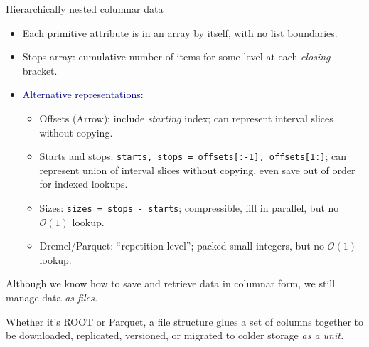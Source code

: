\documentclass[aspectratio=169]{beamer}
\begin{document}
\begin{frame}{Hierarchically nested columnar data}
\begin{itemize}
\item<3-> Each primitive attribute is in an array by itself, with no list boundaries.
\item<4-> Stops array: cumulative number of items for some level at each {\it closing} bracket.
\item<5-> \textcolor{darkblue}{Alternative representations:}
\begin{itemize}
\item<5-> Offsets (Arrow): include {\it starting} index; can represent interval slices without copying.
\item<6-> Starts and stops: {\tt\scriptsize starts, stops = offsets[:-1], offsets[1:]}; can represent union of interval slices without copying, even save out of order for indexed lookups.
\item<7-> Sizes: {\tt\scriptsize sizes = stops - starts}; compressible, fill in parallel, but no $\mathcal{O}(1)$ lookup.
\item<8-> Dremel/Parquet: ``repetition level''; packed small integers, but no $\mathcal{O}(1)$ lookup.
\end{itemize}
\end{itemize}
\end{frame}

\begin{frame}{}
\begin{center}
\begin{minipage}{0.8\linewidth}
\begin{center}
\Large Although we know how to save and retrieve data in columnar form, we still manage data {\it as files.}
\end{center}
\end{minipage}
\end{center}

\vspace{0.5 cm}
Whether it's ROOT or Parquet, a file structure glues a set of columns together to be downloaded, replicated, versioned, or migrated to colder storage {\it as a unit.}
\end{frame}
\end{document}
